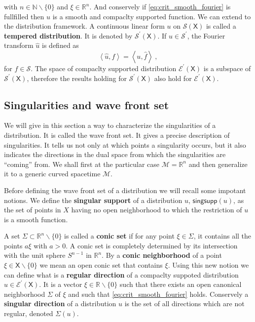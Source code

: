\documentclass[10pt]{book}
\newcommand{\singsupp}{\mathsf{singsupp}}
\newcommand{\sm}[1]{\left\langle#1\right\rangle}
\newcommand{\Ecal}{\mathcal{E}}
\newcommand{\Mcal}{\mathcal{M}}
\newcommand{\Scal}{\mathcal{S}}
\newcommand{\Nbb}{\mathbb{N}}
\newcommand{\Rbb}{\mathbb{R}}
\newcommand{\Xsf}{\mathsf{X}}
\theoremstyle{break}
\begin{document}
%
with $n \in \Nbb \backslash \{0\}$ and $\xi \in \Rbb^n$. And conservely if \eqref{eq:crit_smooth_fourier} is fullfilled then $u$ is a smooth and compaclty supported function. We can extend to the distribution framework. A continuous linear form $u$ on $\Scal(\Xsf)$ is called a \textbf{tempered distribution}. It is denoted by $\Scal^\prime(\Xsf)$. 
%
If $u \in \Scal^\prime$, the Fourier transform $\hat{u}$ is defined as 
%
\begin{equation*}
\sm{\hat{u},f} = \sm{u,\hat{f}} \ ,
\end{equation*}
%
for $f \in \Scal$. The space of compaclty supported distribution $\Ecal^\prime(\Xsf)$ is a subspace of $\Scal^\prime(\Xsf)$, therefore the results holding for $\Scal^\prime(\Xsf)$ also hold for $\Ecal^\prime(\Xsf)$. 


\subsection{Singularities and wave front set}

We will give in this section a way to characterize the singularities of a distribution. It is called the wave front set. It gives a precise description of singularities. It tells us not only at which points a singularity occurs, but it also indicates the directions in the dual space from which the singularities are ``coming'' from. We shall first at the particular case $\Mcal = \Rbb^n$ and then generalize it to a generic curved spacetime $\Mcal$. 


\bigskip


Before defining the wave front set of a distribution we will recall some impotant notions. We define the \textbf{singular support} of a distribution $u$, $\singsupp(u)$, as the set of points in $X$ having no open neighborhood to which the restriction of $u$ is a smooth function. 


\bigskip


A set $\Sigma \subset \Rbb^n \backslash \{0\}$ is called a \textbf{conic set} if for any point $\xi \in \Sigma$, it contains all the points $a \xi$ with $a > 0$. A conic set is completely determined by its intersection with the unit sphere $S^{n-1}$ in $\Rbb^n$. By a \textbf{conic neighborhood} of a point $\xi \in \Xsf \backslash \{0\}$ we mean an open conic set that contains $\xi$. Using this new notion we can define what is a \textbf{regular direction} of a compaclty suppoted distribution $u\in\Ecal^\prime(\Xsf)$. It is a vector $\xi \in \Rbb\backslash\{0\}$ such that there exists an open canonical neighborhood $\Sigma$ of $\xi$ and such that \eqref{eq:crit_smooth_fourier} holds. Conservely a \textbf{singular direction} of a distribution $u$ is the set of all directions which are not regular, denoted $\Sigma (u)$.
\end{document}

